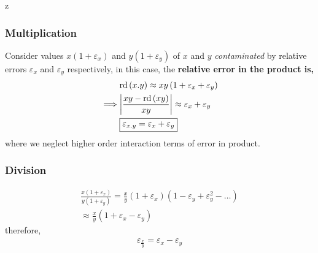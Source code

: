 z\documentclass[a4paper,12pt,twoside]{book}
\DeclarePairedDelimiter\abs{\lvert}{\rvert}
\begin{document}
\subsubsection{Multiplication}
Consider values $x\left( 1+\varepsilon_x \right) $ and $y\left( 1+\varepsilon_y \right) $ of $x$ and $y$ \textit{contaminated} by relative errors $\varepsilon_x$ and $\varepsilon_y$ respectively, in this case, the \textbf{relative error in the product is,}
\begin{equation*}
	\begin{split}
		&\text{rd}\left( x.y \right) \approx xy\left( 1+ \varepsilon_x+\varepsilon_y\right) \\
	\implies & \abs*{\frac{xy - \text{rd}\left( xy \right)}{xy} } \approx \varepsilon_x+\varepsilon_y\\
&\boxed{\varepsilon_{x.y}=\varepsilon_x + \varepsilon_y} 
	\end{split}
\end{equation*}
where we neglect higher order interaction terms of error in product.
\subsubsection{Division}
\begin{equation*}
	\begin{split}
		\frac{x\left( 1+\varepsilon_x \right) }{y\left( 1+\varepsilon_y \right) } = \frac{x}{y} \left( 1+\varepsilon_x \right) \left( 1-\varepsilon_y+\varepsilon_y^2-\dots \right) \\
		\approx \frac{x}{y} \left( 1+\varepsilon_x-\varepsilon_y \right) 
	\end{split}
\end{equation*}
therefore,
\begin{equation*}
	\begin{split}
		\boxed{\varepsilon_{\frac{x}{y}} = \varepsilon_x - \varepsilon_y}
	\end{split}
\end{equation*}
\end{document}
